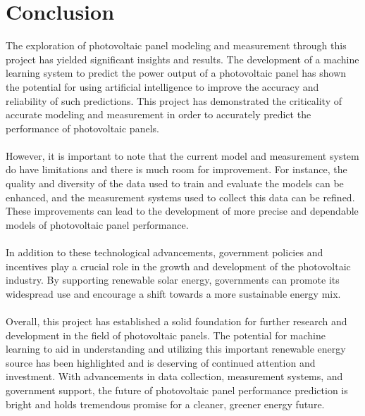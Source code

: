 \documentclass{report}
\begin{document}
\chapter{Conclusion}
The exploration of photovoltaic panel modeling and measurement through this project has yielded significant insights and results. The development of a machine learning system to predict the power output of a photovoltaic panel has shown the potential for using artificial intelligence to improve the accuracy and reliability of such predictions. This project has demonstrated the criticality of accurate modeling and measurement in order to accurately predict the performance of photovoltaic panels.\\
\\
However, it is important to note that the current model and measurement system do have limitations and there is much room for improvement. For instance, the quality and diversity of the data used to train and evaluate the models can be enhanced, and the measurement systems used to collect this data can be refined. These improvements can lead to the development of more precise and dependable models of photovoltaic panel performance.\\
\\
In addition to these technological advancements, government policies and incentives play a crucial role in the growth and development of the photovoltaic industry. By supporting renewable solar energy, governments can promote its widespread use and encourage a shift towards a more sustainable energy mix.\\
\\
Overall, this project has established a solid foundation for further research and development in the field of photovoltaic panels. The potential for machine learning to aid in understanding and utilizing this important renewable energy source has been highlighted and is deserving of continued attention and investment. With advancements in data collection, measurement systems, and government support, the future of photovoltaic panel performance prediction is bright and holds tremendous promise for a cleaner, greener energy future.
\end{document}
